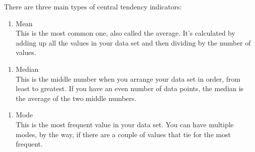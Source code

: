 \documentclass[
]{book}
\newenvironment{Shaded}{\begin{snugshade}}{\end{snugshade}}
\newcommand{\CommentTok}[1]{\textcolor[rgb]{0.56,0.35,0.01}{\textit{#1}}}
\newcommand{\FunctionTok}[1]{\textcolor[rgb]{0.13,0.29,0.53}{\textbf{#1}}}
\newcommand{\NormalTok}[1]{#1}
\newcommand{\SpecialCharTok}[1]{\textcolor[rgb]{0.81,0.36,0.00}{\textbf{#1}}}
\providecommand{\tightlist}{%
  \setlength{\itemsep}{0pt}\setlength{\parskip}{0pt}}
\begin{document}
There are three main types of central tendency indicators:

\begin{enumerate}
\def\labelenumi{\arabic{enumi}.}
\tightlist
\item
  Mean\\
  This is the most common one, also called the average. It's calculated by adding up all the values in your data set and then dividing by the number of values.\\
\end{enumerate}

\begin{Shaded}
\end{Shaded}

\begin{enumerate}
\def\labelenumi{\arabic{enumi}.}
\setcounter{enumi}{1}
\tightlist
\item
  Median\\
  This is the middle number when you arrange your data set in order, from least to greatest. If you have an even number of data points, the median is the average of the two middle numbers.\\
\end{enumerate}

\begin{Shaded}
\end{Shaded}

\begin{enumerate}
\def\labelenumi{\arabic{enumi}.}
\setcounter{enumi}{2}
\tightlist
\item
  Mode\\
  This is the most frequent value in your data set. You can have multiple modes, by the way, if there are a couple of values that tie for the most frequent.
\end{enumerate}

\begin{Shaded}
\end{Shaded}
\end{document}
